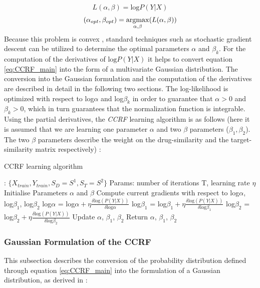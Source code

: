 \begin{equation}  
\label{eq:log_likelihood}
L(\alpha,\beta)=\text{log}P(Y|X)
\end{equation}
\begin{equation}  
(\alpha_{opt}, \beta_{opt}) = \operatorname*{argmax}_{\alpha, \beta}(L(\alpha,\beta))
\end{equation}
Because this problem is convex \cite{qin2009global}, standard techniques such as stochastic gradient descent can be utilized to determine the optimal parameters $\alpha$ and $\beta_k$. For the computation of the derivatives of $\text{log}P(Y|X)$ it helps to convert equation \ref{eq:CCRF_main} into the form of a multivariate Gaussian distribution. The conversion into the Gaussian formulation and the computation of the derivatives are described in detail in the following two sections. The log-likelihood is optimized with respect to log$\alpha$ and log$\beta_k$ in order to guarantee that $\alpha>0$ and $\beta_k>0$, which in turn guarantees that the normalization function is integrable. Using the partial derivatives, the \textit{CCRF} learning algorithm is as follows (here it is assumed that we are learning one parameter $\alpha$ and two $\beta$ parameters ($\beta_1, \beta_2$). The two $\beta$ parameters describe the weight on the drug-similarity and the target-similarity matrix respectively) :

\begin{center}
\begin{algorithm}
\renewcommand\thealgorithm{}
\caption{CCRF learning algorithm}
\begin{algorithmic}
\Require: $\{X_{train}, Y_{train}, S_D = S^1, S_T = S^2\}$
\State Params: number of iterations T, learning rate $\eta$
\State Initialise Parameters $\alpha$ and $\beta$
\State Compute current gradients with respect to log$\alpha$, log$\beta_1$, log$\beta_2$
\State log$\alpha$ = log$ \alpha+\eta\frac{\delta \text{log}(P(Y|X))}{\delta \text{log} \alpha}$
\State log$\beta_1$ = log$ \beta_1 + \eta\frac{\delta \text{log}(P(Y|X))}{\delta \text{log} \beta_1}$
\State log$\beta_2$ = log$ \beta_2 + \eta\frac{\delta \text{log}(P(Y|X))}{\delta \text{log} \beta_2}$
\State Update $\alpha$, $\beta_1$, $\beta_2$
\EndFor
\State Return $\alpha$, $\beta_1$, $\beta_2$
\end{algorithmic}
\end{algorithm}
\end{center}

\subsubsection{Gaussian Formulation of the CCRF}
This subsection describes the conversion of the probability distribution defined through equation \ref{eq:CCRF_main} into the formulation of a Gaussian distribution, as derived in \cite{baltruvsaitis2013dimensional}:

